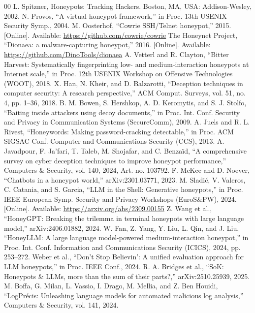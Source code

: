 \documentclass[conference]{IEEEtran}
\begin{document}
\begin{thebibliography}{00}
 L. Spitzner, Honeypots: Tracking Hackers. Boston, MA, USA: Addison-Wesley, 2002.
 N. Provos, ``A virtual honeypot framework,'' in Proc. 13th USENIX Security Symp., 2004.
 M. Oosterhof, ``Cowrie SSH/Telnet honeypot,'' 2015. [Online]. Available: \url{https://github.com/cowrie/cowrie}
 The Honeynet Project, ``Dionaea: a malware-capturing honeypot,'' 2016. [Online]. Available: \url{https://github.com/DinoTools/dionaea}
 A. Vetterl and R. Clayton, ``Bitter Harvest: Systematically fingerprinting low- and medium-interaction honeypots at Internet scale,'' in Proc. 12th USENIX Workshop on Offensive Technologies (WOOT), 2018.
 X. Han, N. Kheir, and D. Balzarotti, ``Deception techniques in computer security: A research perspective,'' ACM Comput. Surveys, vol. 51, no. 4, pp. 1--36, 2018.
 B. M. Bowen, S. Hershkop, A. D. Keromytis, and S. J. Stolfo, ``Baiting inside attackers using decoy documents,'' in Proc. Int. Conf. Security and Privacy in Communication Systems (SecureComm), 2009.
 A. Juels and R. L. Rivest, ``Honeywords: Making password-cracking detectable,'' in Proc. ACM SIGSAC Conf. Computer and Communications Security (CCS), 2013.
 A. Javadpour, F. Ja'fari, T. Taleb, M. Shojafar, and C. Benzaïd, ``A comprehensive survey on cyber deception techniques to improve honeypot performance,'' Computers \& Security, vol. 140, 2024, Art. no. 103792.
 F. McKee and D. Noever, ``Chatbots in a honeypot world,'' arXiv:2301.03771, 2023.
 M. Sladić, V. Valeros, C. Catania, and S. Garcia, ``LLM in the Shell: Generative honeypots,'' in Proc. IEEE European Symp. Security and Privacy Workshops (EuroS\&PW), 2024. [Online]. Available: \url{https://arxiv.org/abs/2309.00155}
 Z. Wang et al., ``HoneyGPT: Breaking the trilemma in terminal honeypots with large language model,'' arXiv:2406.01882, 2024.
 W. Fan, Z. Yang, Y. Liu, L. Qin, and J. Liu, ``HoneyLLM: A large language model-powered medium-interaction honeypot,'' in Proc. Int. Conf. Information and Communications Security (ICICS), 2024, pp. 253--272.
 Weber et al., ``Don't Stop Believin': A unified evaluation approach for LLM honeypots,'' in Proc. IEEE Conf., 2024.
 R. A. Bridges et al., ``SoK: Honeypots \& LLMs, more than the sum of their parts?,'' arXiv:2510.25939, 2025.
 M. Boffa, G. Milan, L. Vassio, I. Drago, M. Mellia, and Z. Ben Houidi, ``LogPrécis: Unleashing language models for automated malicious log analysis,'' Computers \& Security, vol. 141, 2024.

\end{thebibliography}
\end{document}
